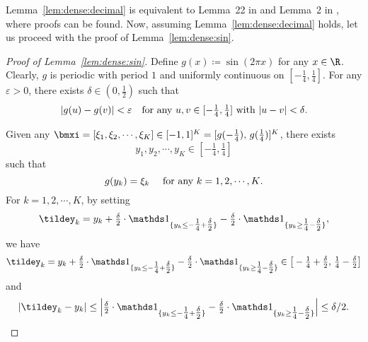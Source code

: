 \documentclass[11pt,a4paper]{article}
\begin{document}
Lemma~\ref{lem:dense:decimal} is equivalent to Lemma~22 in \cite{shijun:arbitrary:error:with:fixed:size} and Lemma~2 in \cite{yarotsky:2021:02}, where proofs can be found. Now, assuming Lemma~\ref{lem:dense:decimal} holds, let us proceed with the proof of Lemma~\ref{lem:dense:sin}.
 
\begin{proof}[Proof of Lemma~\ref{lem:dense:sin}]
	Define $g(x)\coloneqq \sin(2\pi x)$ for any $x\in \R$. Clearly, $g$ is  periodic with period $1$ and  uniformly continuous on $[-\tfrac{1}{4},\tfrac{1}{4}]$. 
	For any $\varepsilon>0$, there exists $\delta\in (0,\tfrac{1}{2})$ such that
	\begin{equation}\label{eq:g:uniformly:cont}
		|g(u)-g(v)|<\varepsilon\quad\textnormal{for any $u,v\in [-\tfrac{1}{4},\tfrac{1}{4}]$ with $|u-v|<\delta$.}
	\end{equation}
	
Given any $\bmxi=[\xi_1,\xi_2,\cdots,\xi_K]\in [-1,1]^K=[g(-\tfrac{1}{4}),\, g(\tfrac{1}{4})]^K$,  there exists
\[y_1,y_2,\cdots,y_K\in [-\tfrac{1}{4},\tfrac{1}{4}]\] 
such that 
\begin{equation}\label{eq:g:zk:xik}
    g(y_k)=\xi_k\quad \textnormal{ for any $k=1,2,\mathinner{\mkern-0.1mu\cdotp\mkern-0.3mu\cdotp\mkern-0.3mu\cdotp\mkern-0.1mu},K$.}
\end{equation}
For $k=1,2,\cdots,K$, 
by setting \begin{equation*}
	\tildey_k=y_k +\tfrac{\delta}{2}\cdot\one_{\{y_k\le -\tfrac{1}{4}+\tfrac{\delta}{2}\}}-\tfrac{\delta}{2}\cdot\one_{\{y_k\ge \tfrac{1}{4}-\tfrac{\delta}{2}\}},
\end{equation*}
 we have 
\begin{equation*}
	\tildey_k=y_k +\tfrac{\delta}{2}\cdot\one_{\{y_k\le -\tfrac{1}{4}+\tfrac{\delta}{2}\}}-\tfrac{\delta}{2}\cdot\one_{\{y_k\ge \tfrac{1}{4}-\tfrac{\delta}{2}\}}\in \big[-\tfrac{1}{4}+\tfrac{\delta}{2},\,\tfrac{1}{4}-\tfrac{\delta}{2}\big]
\end{equation*}
and 
\begin{equation*}
	|\tildey_k-y_k|\le \Big|\tfrac{\delta}{2}\cdot\one_{\{y_k\le -\tfrac{1}{4}+\tfrac{\delta}{2}\}}-\tfrac{\delta}{2}\cdot\one_{\{y_k\ge \tfrac{1}{4}-\tfrac{\delta}{2}\}}\Big|\le \delta/2.
\end{equation*}


\end{proof}
\end{document}
